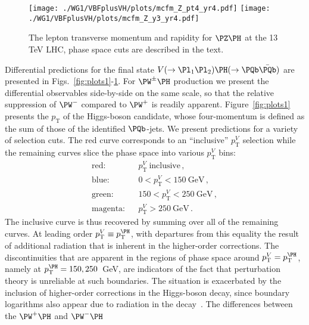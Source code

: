 \begin{figure}
\begin{center}
\texttt{[image: ./WG1/VBFplusVH/plots/mcfm\_Z\_pt4\_yr4.pdf]}
\texttt{[image: ./WG1/VBFplusVH/plots/mcfm\_Z\_y3\_yr4.pdf]}
\end{center}
\caption{The lepton transverse momentum and rapidity for $\PZ\PH$  at the 13 TeV LHC, phase space cuts are described in the text.}
\label{fig:plots5}
\end{figure}

Differential predictions for the final state $V(\rightarrow \Pl_1\Pl_2) \PH(\rightarrow \PQb\bar{\PQb})$ are
presented in Figs.~\ref{fig:plots1}-\ref{fig:plots5}. For $\PW^{\pm}\PH$ production we present the differential
observables side-by-side on the same scale, so that the relative suppression of $\PW^-$ compared to $\PW^+$ is
readily apparent. Figure~\ref{fig:plots1} presents the $p_{\mathrm{T}}$ of the Higgs-boson candidate, whose four-momentum
is defined as the sum of those of the identified $\PQb$-jets. We present
predictions for a variety of selection cuts. The red curve corresponds to an ``inclusive'' $p_{\mathrm{T}}^V$ selection
while the remaining curves slice the phase space into various $p_{\mathrm{T}}^V$ bins:
\begin{eqnarray}
\mbox{red:} && p_{\mathrm{T}}^V~\mbox{inclusive} \,, \nonumber\\
\mbox{blue:} && 0 < p_{\mathrm{T}}^V < 150~\mbox{GeV} \,, \nonumber\\
\mbox{green:} && 150 < p_{\mathrm{T}}^V < 250~\mbox{GeV} \,, \nonumber\\
\mbox{magenta:} && p_{\mathrm{T}}^V > 250~\mbox{GeV} \,.
\end{eqnarray}
The inclusive curve is thus recovered by summing over all of the remaining curves.  At leading order $p_{\mathrm{T}}^V
\equiv p_{\mathrm{T}}^{\PH}$, with departures from this equality the result of additional radiation that is inherent in the
higher-order corrections. The discontinuities that are apparent in the regions of phase space around $p_{\mathrm{T}}^V =
p_{\mathrm{T}}^{\PH}$, namely at $p_{\mathrm{T}}^{\PH} = 150, 250$~GeV, are indicators of the fact that  perturbation theory is unreliable at
such boundaries. The situation is exacerbated by the inclusion of higher-order corrections in the Higgs-boson
decay, since boundary logarithms also appear due to radiation in the
decay~\cite{Ferrera:2013yga,Ferrera:2014lca,Campbell:2016jau}. The differences between the $\PW^+\PH$ and $\PW^-\PH$
